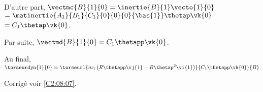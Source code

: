  D'autre part, $\vectmc{B}{1}{0} = \inertie{B}{1}\vecto{1}{0}$
 $ =\matinertie{A_1}{B_1}{C_1}{0}{0}{0}{\bas{1}} \thetap \vk{0}$
  $ =C_1 \thetap \vk{0}$.
  
  Par suite, $\vectmd{B}{1}{0} = C_1 \thetapp \vk{0}$.
  
  Au final, 
$\torseurdyn{1}{0} = \torseurl{m_1\left(R\thetapp \vj{1}-R\thetap^2 \vi{1}\right)}{C_1 \thetapp \vk{0}}{B}$


%


\else
\fi

\ifprof
\else
\fi

\ifprof
\else
\begin{flushright}
\footnotesize{Corrigé  voir \ref{C2:08:07}.}
\end{flushright}%
\fi
